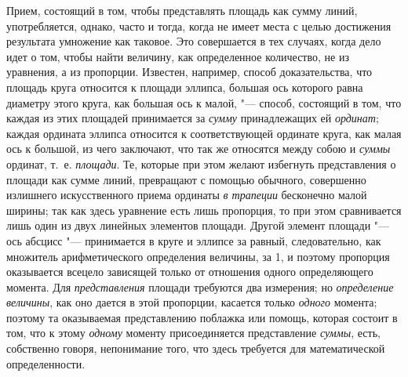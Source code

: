 Прием, состоящий в том, чтобы представлять площадь как сумму линий,
употребляется, однако, часто и тогда, когда не имеет места с целью
достижения результата умножение как таковое. Это совершается в тех случаях,
когда дело идет о том, чтобы найти величину, как определенное количество,
не из уравнения, а из пропорции. Известен, например, способ доказательства,
что площадь круга относится к площади эллипса, большая ось которого равна
диаметру этого круга, как большая ось к малой, "--- способ, состоящий в том,
что каждая из этих площадей принимается за {\em сумму}
принадлежащих ей {\em ординат}; каждая ордината эллипса
относится к соответствующей ординате круга, как малая ось к большой, из
чего заключают, что так же относятся между собою и
{\em суммы} ординат, т.~е.
{\em площади}. Те, которые при этом желают избегнуть
представления о площади как сумме линий, превращают с помощью обычного,
совершенно излишнего искусственного приема ординаты
{\em в трапеции} бесконечно малой ширины; так как здесь
уравнение есть лишь пропорция, то при этом сравнивается лишь один из двух
линейных элементов площади. Другой элемент площади "--- ось абсцисс
"--- принимается в круге и эллипсе за равный, следовательно, как множитель
арифметического определения величины, за 1, и поэтому пропорция оказывается
всецело зависящей только от отношения одного определяющего момента. Для
{\em представления} площади требуются два измерения; но
{\em определение величины}, как оно дается в этой
пропорции, касается только {\em одного} момента;
поэтому та оказываемая представлению поблажка или помощь, которая состоит в
том, что к этому {\em одному} моменту присоединяется
представление {\em суммы}, есть, собственно говоря,
непонимание того, что здесь требуется для математической определенности.

